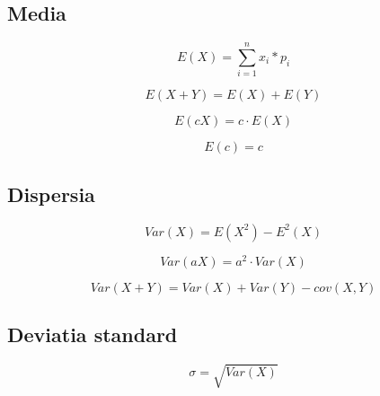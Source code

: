 \documentclass[oneside]{memoir}
\begin{document}
\subsection*{Media}
\begin{center}
    \begin{equation*}
E(X) = \sum_{i=1}^{n}x_i*p_i
    \end{equation*}
\end{center}

\begin{center}
    \begin{equation*}
E(X+Y) = E(X) + E(Y)
    \end{equation*}
\end{center}

\begin{center}
    \begin{equation*}
E(cX) = c\cdot E(X)
    \end{equation*}
\end{center}

\begin{center}
    \begin{equation*}
E(c) = c
    \end{equation*}
\end{center}

\subsection*{Dispersia}
\begin{center}
    \begin{equation*}
Var(X) = E(X^2) - E^2(X)
    \end{equation*}
\end{center}

\begin{center}
    \begin{equation*}
Var(aX) = a^2\cdot Var(X)
    \end{equation*}
\end{center}

\begin{center}
    \begin{equation*}
Var(X+Y) = Var(X) + Var(Y) - cov(X,Y)
    \end{equation*}
\end{center}

\subsection*{Deviatia standard}
\begin{center}
    \begin{equation*}
\sigma = \sqrt{Var(X)}
    \end{equation*}
\end{center}
\end{document}
